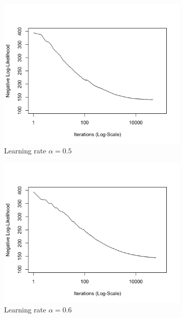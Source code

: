 \documentclass[11 pt]{article}
\begin{document}
\begin{enumerate}[label=(\Alph*)]
\begin{figure}[H]
	\begin{center}
		\begin{subfigure}[h]{0.45\linewidth}
			\includegraphics[width=\linewidth]{Fig/F3PD05.png}
			\caption{Learning rate $\alpha=0.5$}
		\end{subfigure}
		\begin{subfigure}[h]{0.45\linewidth}
			\includegraphics[width=\linewidth]{Fig/F3PD06.png}
			\caption{Learning rate $\alpha=0.6$}
		\end{subfigure}
		\begin{subfigure}[h]{0.45\linewidth}

\end{subfigure}
\end{center}
\end{figure}
\end{enumerate}
\end{document}
